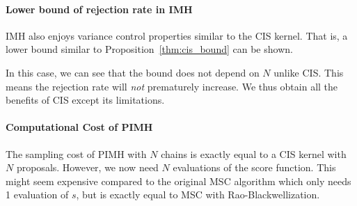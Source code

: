 \paragraph{Lower bound of rejection rate in IMH}
IMH also enjoys variance control properties similar to the CIS kernel.
That is, a lower bound similar to Proposition~\eqref{thm:cis_bound} can be shown.
%

%
In this case, we can see that the bound does not depend on \(N\) unlike CIS.
This means the rejection rate will \textit{not} prematurely increase.
We thus obtain all the benefits of CIS except its limitations.

\paragraph{Computational Cost of PIMH}
The sampling cost of PIMH with \(N\) chains is exactly equal to a CIS kernel with \(N\) proposals.
However, we now need \(N\) evaluations of the score function.
This might seem expensive compared to the original MSC algorithm which only needs 1 evaluation of \(s\), but is exactly equal to MSC with Rao-Blackwellization.

